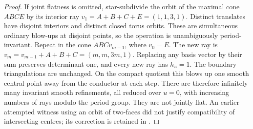 \begin{proof}
If joint flatness is omitted, star-subdivide the orbit of the
maximal cone $ABCE$ by its interior ray
$v_1=A+B+C+E=(1,1,3,1)$. Distinct translates have disjoint
interiors and distinct closed torus orbits. These are simultaneous
ordinary blow-ups at disjoint points, so the operation is
unambiguously period-invariant. Repeat in the cone $ABCv_{m-1}$,
where $v_0=E$. The new ray is
$v_m=v_{m-1}+A+B+C=(m,m,3m,1)$. Replacing any basis vector
by their sum preserves determinant one, and every new ray has
$h_u=1$. The boundary triangulations are unchanged. On the
compact quotient this blows up one smooth central point away
from the conductor at each step. There are therefore infinitely
many invariant smooth refinements, all reduced over $u=0$, with
increasing numbers of rays modulo the period group. They are
not jointly flat. An earlier attempted witness using an orbit
of two-faces did not justify compatibility of intersecting
centres; its correction is retained in
.
\end{proof}

